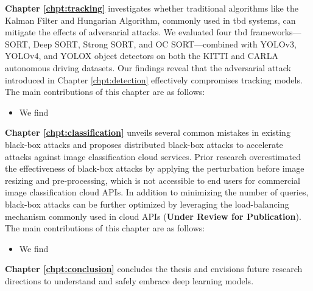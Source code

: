 \vspace{0.5cm}

\noindent \textbf{Chapter \ref{chpt:tracking}} investigates whether traditional algorithms like the Kalman Filter and Hungarian Algorithm, commonly used in \acrfull{tbd} systems, can mitigate the effects of adversarial attacks. We evaluated four \acrshort{tbd} frameworks—SORT, Deep SORT, Strong SORT, and OC SORT—combined with YOLOv3, YOLOv4, and YOLOX object detectors on both the KITTI and CARLA autonomous driving datasets. Our findings reveal that the adversarial attack introduced in Chapter \ref{chpt:detection} effectively compromises tracking models. The main contributions of this chapter are as follows:
\begin{itemize}
    \item We find
\end{itemize}

\vspace{0.5cm}

\noindent \textbf{Chapter \ref{chpt:classification}} unveils several common mistakes in existing black-box attacks and proposes distributed black-box attacks to accelerate attacks against image classification cloud services. Prior research overestimated the effectiveness of black-box attacks by applying the perturbation before image resizing and pre-processing, which is not accessible to end users for commercial image classification cloud APIs. In addition to minimizing the number of queries, black-box attacks can be further optimized by leveraging the load-balancing mechanism commonly used in cloud APIs (\textbf{Under Review for Publication}). The main contributions of this chapter are as follows:

\begin{itemize}
    \item We find
\end{itemize}

\vspace{0.5cm}

\noindent \textbf{Chapter \ref{chpt:conclusion}} concludes the thesis and envisions future research directions to understand and safely embrace deep learning models. 

